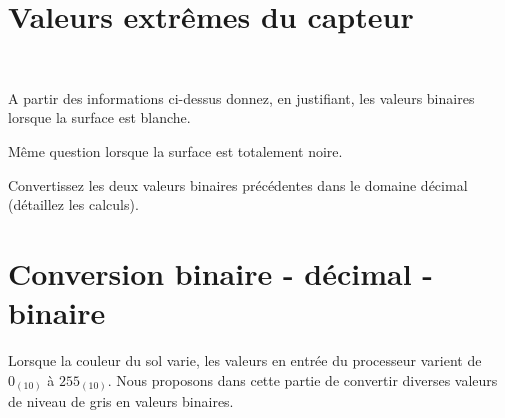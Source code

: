 \documentclass[10pt,fleqn]{article} %
\begin{document}
\section{Valeurs extrêmes du capteur}
\begin{exercise}~
\begin{question}
  A partir des informations ci-dessus donnez, en justifiant, les valeurs binaires lorsque la surface est blanche. 
\end{question}
\begin{question}
  Même question lorsque la surface est totalement noire. 
\end{question}
\begin{question}
  Convertissez les deux valeurs binaires précédentes dans le domaine décimal (détaillez les calculs). 
\end{question}
\end{exercise}

\section{Conversion binaire - décimal - binaire}

Lorsque la couleur du sol varie, les valeurs en entrée du processeur varient de $0_{(10)}$ à $255_{(10)}$. Nous proposons dans cette partie de convertir diverses valeurs de niveau de gris en valeurs binaires. 
\end{document}
